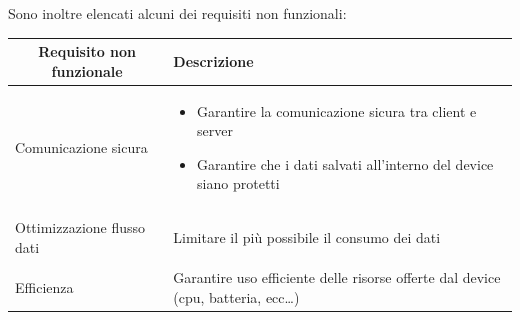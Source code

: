 \newpage
Sono inoltre elencati alcuni dei requisiti non funzionali:

\begin{center}
    

    \begin{tabular}{p{6cm}|p{8cm}}

    \toprule
    \multicolumn{1}{c}{\textbf{Requisito non funzionale}} &
    \textbf{Descrizione}\\

    \midrule
    Comunicazione sicura & \begin{itemize}
                            \item Garantire la comunicazione sicura tra client e server
                            \item Garantire che i dati salvati all'interno del device siano protetti
                           \end{itemize}\\\\
    Ottimizzazione flusso dati & Limitare il più possibile il consumo dei dati\\\\
    Efficienza & Garantire uso efficiente delle risorse offerte dal device (cpu, batteria, ecc\dots)\\

    \bottomrule

    \end{tabular}

\end{center}

